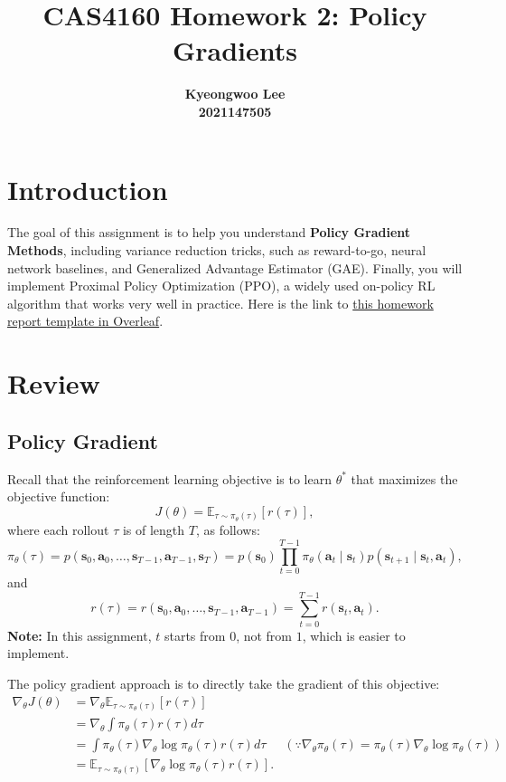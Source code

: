 \documentclass{article}
\title{CAS4160 Homework 2: Policy Gradients}
\author{
    \textbf{Kyeongwoo Lee} \\
    \textbf{2021147505}
}
\def\rva{{\mathbf{a}}}
\def\rvs{{\mathbf{s}}}
\begin{document}
\maketitle

\section{Introduction}

The goal of this assignment is to help you understand \textbf{Policy Gradient Methods}, including variance reduction tricks, such as reward-to-go, neural network baselines, and Generalized Advantage Estimator (GAE). Finally, you will implement Proximal Policy Optimization (PPO), a widely used on-policy RL algorithm that works very well in practice. Here is the link to \href{https://www.overleaf.com/read/xtwbvpnqgxrn#0fb229}{this homework report template in Overleaf}.

\section{Review}

\subsection{Policy Gradient}
Recall that the reinforcement learning objective is to learn $\theta^{*}$ that maximizes the objective function:
\begin{equation}
    J(\theta)=\mathbb{E}_{\tau \sim \pi_{\theta}(\tau)}[r(\tau)],
\end{equation}
where each rollout $\tau$ is of length $T$, as follows:
\begin{equation*}
    \pi_\theta(\tau) = p\left(\rvs_0, \rva_0, \ldots, \rvs_{T-1}, \rva_{T-1}, \rvs_T \right) = p\left(\rvs_0\right) \prod_{t=0}^{T-1} \pi_\theta\left(\rva_t \mid \rvs_t \right) p\left(\rvs_{t+1} \mid \rvs_{t}, \rva_{t}\right),
\end{equation*}
and
\begin{equation*}
    r(\tau)=r\left(\rvs_0, \rva_0, \ldots, \rvs_{T-1}, \rva_{T-1}\right) = \sum_{t=0}^{T-1} r\left(\rvs_t, \rva_t\right).
\end{equation*}
\textbf{Note:} In this assignment, $t$ starts from $0$, not from $1$, which is easier to implement.

The policy gradient approach is to directly take the gradient of this objective:
\begin{align*}
    \nabla_{\theta} J(\theta) & = \nabla_{\theta} \mathbb{E}_{\tau \sim \pi_{\theta}(\tau)}[r(\tau)] & \\
                                & =\nabla_{\theta} \int \pi_{\theta}(\tau) r(\tau) d \tau &  \\
                                & =\int \pi_{\theta}(\tau) \nabla_{\theta} \log \pi_{\theta}(\tau) r(\tau) d \tau & (\because \nabla_\theta \pi_\theta(\tau) = \pi_\theta(\tau) \nabla_\theta \log \pi_\theta(\tau)) \\
                                & =\mathbb{E}_{\tau \sim \pi_{\theta}(\tau)}\left[\nabla_{\theta} \log \pi_{\theta}(\tau) r(\tau)\right]. &
\end{align*}
\end{document}
